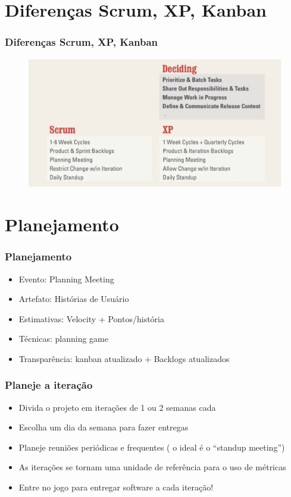 \section{Diferenças  Scrum, XP, Kanban}
\begin{frame}
 \frametitle{Diferenças  Scrum, XP, Kanban}
  \begin{figure}
   \centering
   \includegraphics[width = \textwidth]{figs/deciding_scrum_xp.png}
  \end{figure}
\end{frame}



\section{Planejamento}
\begin{frame}
  \frametitle{Planejamento}
    \begin{itemize}
     \item Evento: Planning Meeting
     \item Artefato: Histórias de Usuário
     \item Estimativas: Velocity + Pontos/história
     \item Técnicas: planning game
     \item Transparência: kanban atualizado + Backlogs atualizados
    \end{itemize}
\end{frame}

\begin{frame}
  \frametitle{Planeje a iteração}
    \begin{itemize}
     \item Divida o projeto em iterações de 1 ou 2 semanas cada
     \item Escolha um dia da semana para fazer entregas
     \item Planeje reuniões periódicas e frequentes ( o ideal é o “standup meeting”)
     \item As iterações se tornam uma unidade de referência para o uso de métricas
     \item Entre no jogo para entregar software a cada iteração!
    \end{itemize}
\end{frame}



